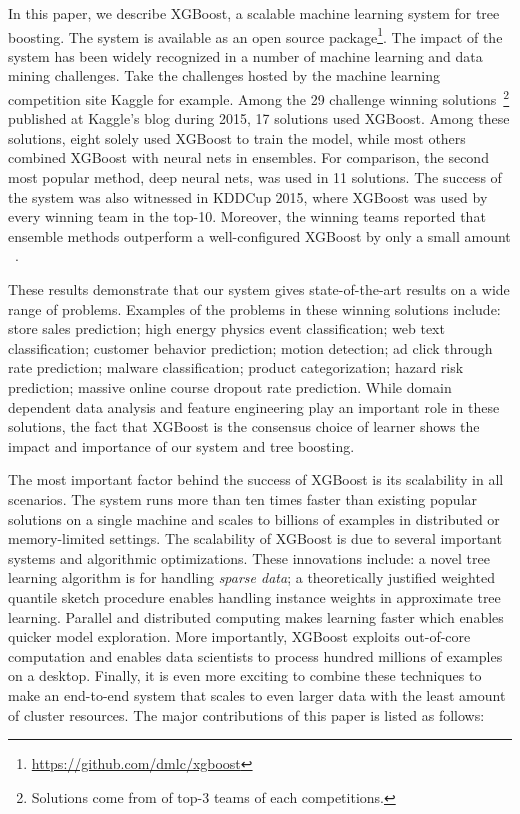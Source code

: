 In this paper, we describe XGBoost, a scalable machine learning system for tree boosting. The system is available as an open source package\footnote{\url{https://github.com/dmlc/xgboost}}.
The impact of the system has been widely recognized in a number of machine learning and data mining challenges. Take the challenges hosted by the machine learning competition site Kaggle for example.  Among the 29 challenge winning solutions~\footnote{Solutions come from of top-3 teams of each competitions.} published at Kaggle's blog during 2015, 17 solutions used XGBoost.  Among these solutions, eight solely used XGBoost to train the model, while most others combined XGBoost with neural nets in ensembles. For comparison, the second most popular method, deep neural nets, was used in 11 solutions. The success of the system was also witnessed in KDDCup 2015, where XGBoost was used by every winning team in the top-10. Moreover, the winning teams reported that ensemble methods outperform a well-configured XGBoost by only a small amount ~\cite{Bekkerman:KDDCup}.

These results demonstrate that our system gives state-of-the-art results on a wide range of problems. Examples of the problems in these winning solutions include: store sales prediction; high energy physics event classification; web text classification; customer behavior prediction; motion detection; ad click through rate prediction; malware classification; product categorization; hazard risk prediction; massive online course dropout rate prediction. While domain dependent data analysis and feature engineering play an important role in these solutions, the fact that XGBoost is the consensus choice of learner shows the impact and importance of our system and tree boosting.

The most important factor behind the success of XGBoost is its scalability in all scenarios. The system runs more than ten times faster than existing popular solutions on a single machine and scales to billions of examples in distributed or memory-limited settings. The scalability of XGBoost is due to several important systems and algorithmic optimizations.  These innovations include: a novel tree learning algorithm is for handling \emph{sparse data}; a theoretically justified weighted quantile sketch procedure enables handling instance weights in approximate tree learning. Parallel and distributed computing makes learning faster which enables quicker model exploration. More importantly, XGBoost exploits out-of-core computation and enables data scientists to process hundred millions of examples on a desktop. Finally, it is even more exciting to combine these techniques to make an end-to-end system that scales to even larger data with the least amount of cluster resources. The major contributions of this paper is listed as follows:

